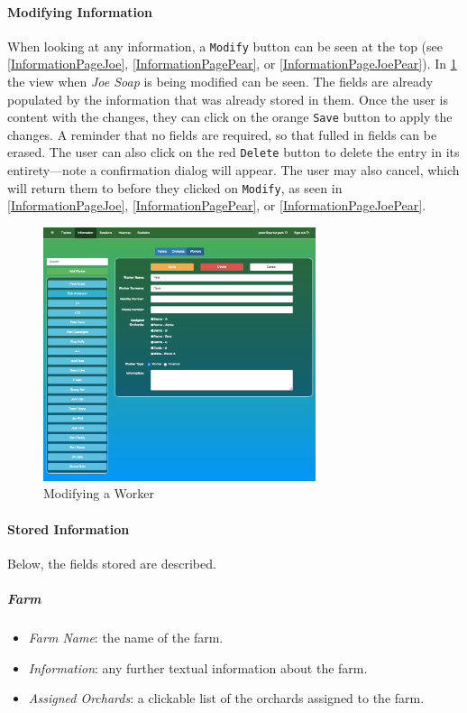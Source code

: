 \documentclass[11pt]{article}
\begin{document}
\paragraph{Modifying Information}When looking at any information, a \texttt{Modify} button can be seen at the top (see \ref{InformationPageJoe}, \ref{InformationPagePear}, or \ref{InformationPageJoePear}). In \ref{InformationModJoe} the view when \textit{Joe Soap} is being modified can be seen. The fields are already populated by the information that was already stored in them. Once the user is content with the changes, they can click on the orange \texttt{Save} button to apply the changes. A reminder that no fields are required, so that fulled in fields can be erased. The user can also click on the red \texttt{Delete} button to delete the entry in its entirety---note a confirmation dialog will appear. The user may also cancel, which will return them to before they clicked on \texttt{Modify}, as seen in \ref{InformationPageJoe}, \ref{InformationPagePear}, or \ref{InformationPageJoePear}.

\begin{figure}
 \centering
 \includegraphics[width=8cm, keepaspectratio]{Images/UsingSystem/WebWorkerEdit.png}
 \caption{Modifying a Worker}
 \label{InformationModJoe}
\end{figure}

\paragraph{Stored Information}
Below, the fields stored are described.
\subparagraph{Farm}
\begin{itemize}
 \item \textit{Farm Name}: the name of the farm.
 \item \textit{Information}: any further textual information about the farm.
 \item \textit{Assigned Orchards}: a clickable list of the orchards assigned to the farm.
\end{itemize}
\end{document}
